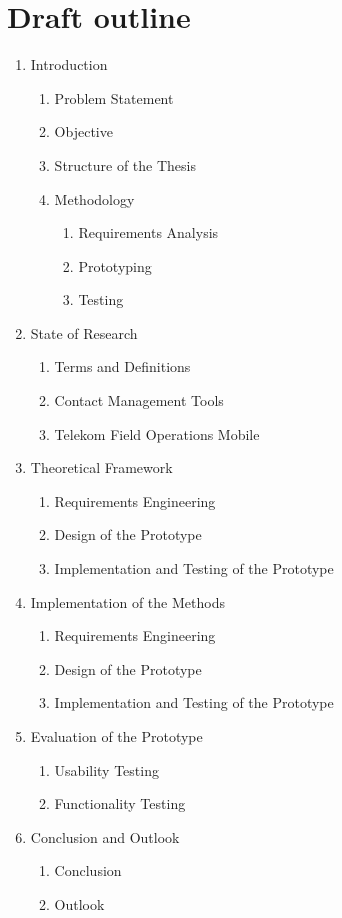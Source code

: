 \newpage
\section{Draft outline}


\begin{enumerate}
    \item Introduction
    \begin{enumerate}
        \item Problem Statement
        \item Objective
        \item Structure of the Thesis
        \item Methodology
        \begin{enumerate}
            \item Requirements Analysis
            \item Prototyping
            \item Testing
        \end{enumerate}
    \end{enumerate}
    \item State of Research
    \begin{enumerate}
        \item Terms and Definitions
        \item Contact Management Tools
        \item Telekom Field Operations Mobile
    \end{enumerate}
    \item Theoretical Framework
    \begin{enumerate}
        \item Requirements Engineering
        \item Design of the Prototype
        \item Implementation and Testing of the Prototype
    \end{enumerate}
    \item Implementation of the Methods
    \begin{enumerate}
        \item Requirements Engineering
        \item Design of the Prototype
        \item Implementation and Testing of the Prototype
    \end{enumerate}
    \item Evaluation of the Prototype
    \begin{enumerate}
        \item Usability Testing
        \item Functionality Testing
    \end{enumerate}
    \item Conclusion and Outlook
    \begin{enumerate}
        \item Conclusion
        \item Outlook
    \end{enumerate}
\end{enumerate}

